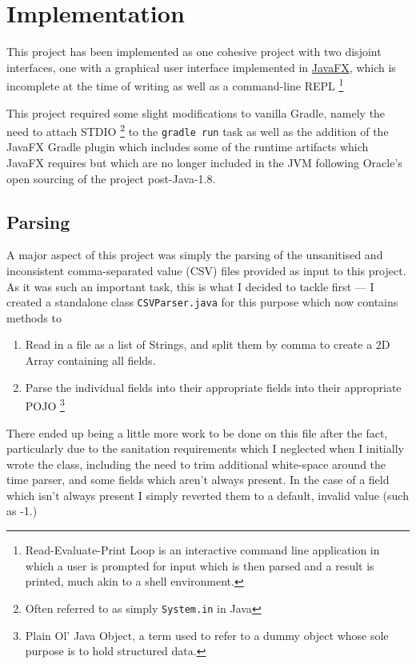 \documentclass[12pt]{report}
\begin{document}
	\section{Implementation} 
	This project has been implemented as one cohesive project with two disjoint interfaces, one with a graphical user interface implemented in \href{https://openjfx.io}{JavaFX}, which is incomplete at the time of writing as well as a command-line REPL \footnote{Read-Evaluate-Print Loop is an interactive command line application in which a user is prompted for input which is then parsed and a result is printed, much akin to a shell environment.} \newline
	
	This project required some slight modifications to vanilla Gradle, namely the need to attach STDIO \footnote{Often referred to as simply \texttt{System.in} in Java} to the \texttt{gradle run} task as well as the addition of the JavaFX Gradle plugin which includes some of the runtime artifacts which JavaFX requires but which are no longer included in the JVM following Oracle's open sourcing of the project post-Java-1.8. \newline
	
	\subsection{Parsing}
	A major aspect of this project was simply the parsing of the unsanitised and inconsistent comma-separated value (CSV) files provided as input to this project. As it was such an important task, this is what I decided to tackle first --- I created a standalone class \texttt{CSVParser.java} for this purpose which now contains methods to 
	\begin{enumerate}
		\item Read in a file as a list of Strings, and split them by comma to create a 2D Array containing all fields. 
		\item Parse the individual fields into their appropriate fields into their appropriate POJO \footnote{Plain Ol' Java Object, a term used to refer to a dummy object whose sole purpose is to hold structured data.} 
	\end{enumerate}
	There ended up being a little more work to be done on this file after the fact, particularly due to the sanitation requirements which I neglected when I initially wrote the class, including the need to trim additional white-space around the time parser, and some fields which aren't always present. In the case of a field which isn't always present I simply reverted them to a default, invalid value (such as -1.)
\end{document}

